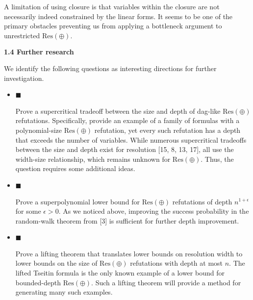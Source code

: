 A limitation of using closure is that variables within the closure are not necessarily indeed constrained by the linear forms. It seems to be one of the primary obstacles preventing us from applying a bottleneck argument to unrestricted $\mathrm{Res}(\oplus)$.\par


\par\medskip\noindent\textbf{
1.4 Further research}\par


We identify the following questions as interesting directions for further investigation.\par


\begin{itemize}


\item 
$\blacksquare$ 


Prove a supercritical tradeoff between the size and depth of dag-like $\mathrm{Res}(\oplus)$ refutations. Specifically, provide an example of a family of formulas with a polynomial-size $\mathrm{Res}(\oplus)$ refutation, yet every such refutation has a depth that exceeds the number of variables. While numerous supercritical tradeoffs between the size and depth exist for resolution [15, 8, 13, 17], all use the width-size relationship, which remains unknown for $\mathrm{Res}(\oplus)$. Thus, the question requires some additional ideas.\par





\item 
$\blacksquare$ 


Prove a superpolynomial lower bound for $\mathrm{Res}(\oplus)$ refutations of depth $n^{1+\epsilon}$ for some $\epsilon>0$. As we noticed above, improving the success probability in the random-walk theorem from [3] is sufficient for further depth improvement.\par





\item 
$\blacksquare$ 


Prove a lifting theorem that translates lower bounds on resolution width to lower bounds on the size of $\mathrm{Res}(\oplus)$ refutations with depth at most $n$. The lifted Tseitin formula is the only known example of a lower bound for bounded-depth $\mathrm{Res}(\oplus)$. Such a lifting theorem will provide a method for generating many such examples.\par





\end{itemize}


